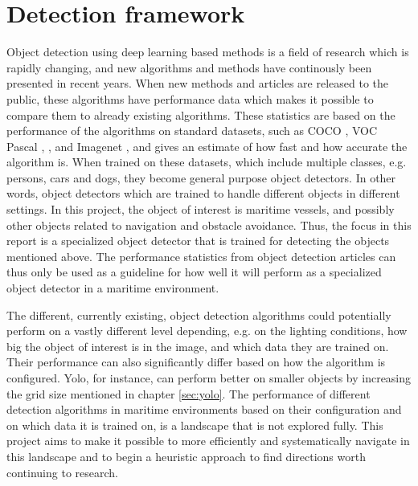 \section{Detection framework}
Object detection using deep learning based methods is a field of research which is rapidly changing, and new algorithms and methods have continously been presented in recent years. When new methods and articles are released to the public, these algorithms have performance data which makes it possible to compare them to already existing algorithms. These statistics are based on the performance of the algorithms on standard datasets, such as COCO \citep{COCO}, VOC Pascal \citep{Everingham2007}, \citep{Everingham2012}, and Imagenet \citep{Imagenet}, and gives an estimate of how fast and how accurate the algorithm is. When trained on these datasets, which include multiple classes, e.g. persons, cars and dogs, they become general purpose object detectors. In other words, object detectors which are trained to handle different objects in different settings. In this project, the object of interest is maritime vessels, and possibly other objects related to navigation and obstacle avoidance. Thus, the focus in this report is a specialized object detector that is trained for detecting the objects mentioned above. The performance statistics from object detection articles can thus only be used as a guideline for how well it will perform as a specialized object detector in a maritime environment. 

\vspace{3mm}

The different, currently existing, object detection algorithms could potentially perform on a vastly different level depending, e.g. on the lighting conditions, how big the object of interest is in the image, and which data they are trained on. Their performance can also significantly differ based on how the algorithm is configured. Yolo, for instance, can perform better on smaller objects by increasing the grid size mentioned in chapter \ref{sec:yolo}. The performance of different detection algorithms in maritime environments based on their configuration and on which data it is trained on, is a landscape that is not explored fully. This project aims to make it possible to more efficiently and systematically navigate in this landscape and to begin a heuristic approach to find directions worth continuing to research.

